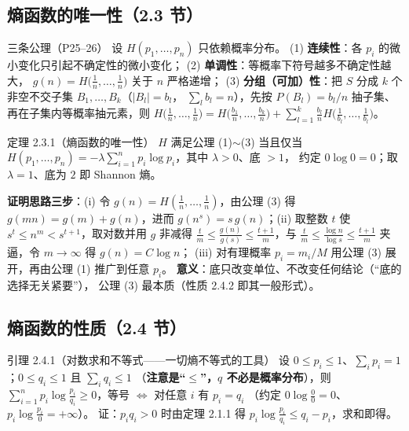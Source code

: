 \subsection{熵函数的唯一性（2.3 节）}

\begin{defbox}{三条公理（P25--26）}
设 $H(p_1,\dots,p_n)$ 只依赖概率分布。
(1) \textbf{连续性}：各 $p_i$ 的微小变化只引起不确定性的微小变化；
(2) \textbf{单调性}：等概率下符号越多不确定性越大，
$g(n)=H\bigl(\tfrac1n,\dots,\tfrac1n\bigr)$ 关于 $n$ 严格递增；
(3) \textbf{分组（可加）性}：把 $S$ 分成 $k$ 个非空不交子集 $B_1,\dots,B_k$（$|B_l|=b_l$，
$\sum_l b_l=n$），先按 $P(B_l)=b_l/n$ 抽子集、再在子集内等概率抽元素，则
$H\bigl(\tfrac1n,\dots,\tfrac1n\bigr)=H\bigl(\tfrac{b_1}{n},\dots,\tfrac{b_k}{n}\bigr)
+\sum_{l=1}^{k}\frac{b_l}{n}H\bigl(\tfrac{1}{b_l},\dots,\tfrac{1}{b_l}\bigr)$。
\end{defbox}

\begin{thmbox}{定理 2.3.1（熵函数的唯一性）}
$H$ 满足公理 (1)$\sim$(3) 当且仅当
$H(p_1,\dots,p_n)=-\lambda\sum_{i=1}^{n}p_i\log p_i$，其中 $\lambda>0$、底 $>1$，
约定 $0\log0=0$；取 $\lambda=1$、底为 $2$ 即 Shannon 熵。
\end{thmbox}

\textbf{证明思路三步}：(i) 令 $g(n)=H(\frac1n,\dots,\frac1n)$，由公理 (3) 得
$g(mn)=g(m)+g(n)$，进而 $g(n^s)=s\,g(n)$；(ii) 取整数 $t$ 使 $s^{t}\le n^{m}<s^{t+1}$，取对数并用
$g$ 非减得 $\frac{t}{m}\le\frac{g(n)}{g(s)}\le\frac{t+1}{m}$，与
$\frac{t}{m}\le\frac{\log n}{\log s}\le\frac{t+1}{m}$ 夹逼，令 $m\to\infty$ 得 $g(n)=C\log n$；
(iii) 对有理概率 $p_i=m_i/M$ 用公理 (3) 展开，再由公理 (1) 推广到任意 $p_i$。
\textbf{意义}：底只改变单位、不改变任何结论（“底的选择无关紧要”），
公理 (3) 最本质（性质 2.4.2 即其一般形式）。

\subsection{熵函数的性质（2.4 节）}

\begin{thmbox}{引理 2.4.1（对数求和不等式——一切熵不等式的工具）}
设 $0\le p_i\le1$、$\sum_i p_i=1$；$0\le q_i\le1$ 且 $\sum_i q_i\le1$
（\textbf{注意是“$\le$”，$q$ 不必是概率分布}），则
$\sum_{i=1}^{n}p_i\log\frac{p_i}{q_i}\ge0$，等号 $\iff$ 对任意 $i$ 有 $p_i=q_i$
（约定 $0\log\frac00=0$、$p_i\log\frac{p_i}{0}=+\infty$）。
证：$p_iq_i>0$ 时由定理 2.1.1 得 $p_i\log\frac{p_i}{q_i}\le q_i-p_i$，求和即得。
\end{thmbox}

